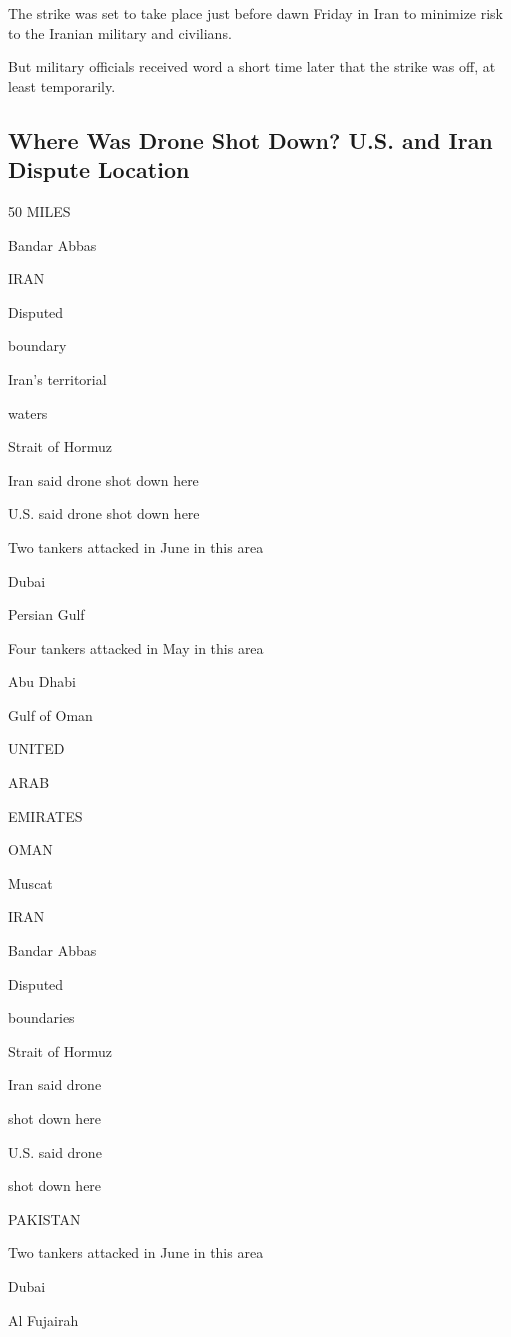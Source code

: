 The strike was set to take place just before dawn Friday in Iran to
minimize risk to the Iranian military and civilians.

But military officials received word a short time later that the strike
was off, at least temporarily.

\hypertarget{where-was-drone-shot-down-us-and-iran-dispute-location}{%
\subsection{Where Was Drone Shot Down? U.S. and Iran Dispute
Location}\label{where-was-drone-shot-down-us-and-iran-dispute-location}}

50 MILES

Bandar Abbas

IRAN

Disputed

boundary

Iran's territorial

waters

Strait of Hormuz

Iran said drone shot down here

U.S. said drone shot down here

Two tankers attacked in June in this area

Dubai

Persian Gulf

Four tankers attacked in May in this area

Abu Dhabi

Gulf of Oman

UNITED

ARAB

EMIRATES

OMAN

Muscat

IRAN

Bandar Abbas

Disputed

boundaries

Strait of Hormuz

Iran said drone

shot down here

U.S. said drone

shot down here

PAKISTAN

Two tankers attacked in June in this area

Dubai

Al Fujairah

